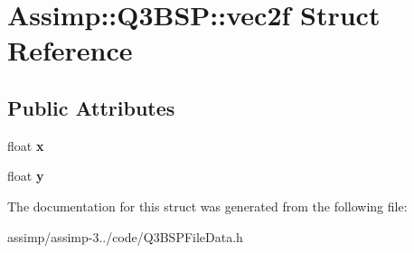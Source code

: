 \hypertarget{struct_assimp_1_1_q3_b_s_p_1_1vec2f}{\section{Assimp\+:\+:Q3\+B\+S\+P\+:\+:vec2f Struct Reference}
\label{struct_assimp_1_1_q3_b_s_p_1_1vec2f}
}
\subsection*{Public Attributes}
\begin{DoxyCompactItemize}
\item 
\hypertarget{struct_assimp_1_1_q3_b_s_p_1_1vec2f_a0a0ce186a5697f35b9338ec38926f340}{float {\bfseries x}}\label{struct_assimp_1_1_q3_b_s_p_1_1vec2f_a0a0ce186a5697f35b9338ec38926f340}

\item 
\hypertarget{struct_assimp_1_1_q3_b_s_p_1_1vec2f_afebf8eb866766a82beb4def49bc72932}{float {\bfseries y}}\label{struct_assimp_1_1_q3_b_s_p_1_1vec2f_afebf8eb866766a82beb4def49bc72932}

\end{DoxyCompactItemize}


The documentation for this struct was generated from the following file\+:\begin{DoxyCompactItemize}
\item 
assimp/assimp-\/3../code/Q3\+B\+S\+P\+File\+Data.\+h\end{DoxyCompactItemize}

